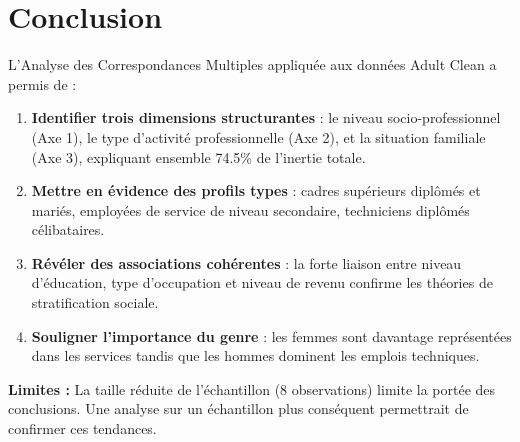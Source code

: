 \documentclass[12pt,a4paper]{article}
\begin{document}
\section{Conclusion}

L'Analyse des Correspondances Multiples appliquée aux données Adult Clean a permis de :

\begin{enumerate}
    \item \textbf{Identifier trois dimensions structurantes} : le niveau socio-professionnel (Axe 1), le type d'activité professionnelle (Axe 2), et la situation familiale (Axe 3), expliquant ensemble 74.5\% de l'inertie totale.
    
    \item \textbf{Mettre en évidence des profils types} : cadres supérieurs diplômés et mariés, employées de service de niveau secondaire, techniciens diplômés célibataires.
    
    \item \textbf{Révéler des associations cohérentes} : la forte liaison entre niveau d'éducation, type d'occupation et niveau de revenu confirme les théories de stratification sociale.
    
    \item \textbf{Souligner l'importance du genre} : les femmes sont davantage représentées dans les services tandis que les hommes dominent les emplois techniques.
\end{enumerate}

\textbf{Limites :} La taille réduite de l'échantillon (8 observations) limite la portée des conclusions. Une analyse sur un échantillon plus conséquent permettrait de confirmer ces tendances.
\end{document}
